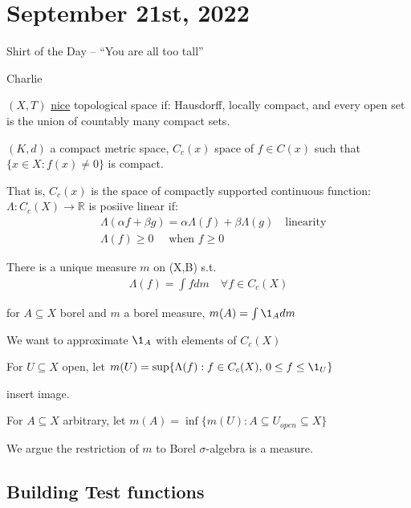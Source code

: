 \section{September 21st, 2022}

\epigraph{Shirt of the Day -- ``You are all too tall''}{Charlie}

\begin{definition}
	$(X,T)$ \underline{nice} topological space if: Hausdorff, locally compact, and every open set is the union of countably many compact sets.
\end{definition}

\begin{example}
	$(K,d)$ a compact metric space, $C_c (x)$ space of $f \in C(x)$ such that $\{x\in X: f(x) \neq 0 \}$ is compact.

	That is, $C_c (x)$ is the space of compactly supported continuous function:
		$\Lambda : C_c(X) \to \mathbb{R}$ is posiive linear if:
	\begin{align*}
		&\Lambda(\alpha f + \beta g) = \alpha \Lambda(f) + \beta \Lambda(g) \quad \text{linearity} \\
		&\Lambda(f) \geq 0 \quad \text{ when } f \geq 0
	\end{align*} 
\end{example}


\begin{theorem}
	There is a unique measure $m$ on (X,B) s.t.
	\begin{align*}
		\Lambda(f) = \int f dm \quad \forall f \in C_c (X)
	\end{align*} 
\end{theorem}

\begin{definition}[defining m]
	for $A \subseteq X$ borel and $m$ a borel measure, $m(A) = \int \1_{A} dm$
\end{definition}

We want to approximate $\1_A$ with elements of $C_c (X)$

For $U \subseteq X $ open, let $m(U) = \sup\{\Lambda (f) : f \in C_c (X), \, 0 \leq f \leq \1_{U} \}$

insert image.

For $A \subseteq X$ arbitrary, let $m(A) = \inf\{m(U) : A \subseteq U_{open} \subseteq X\}$

We argue the restriction of $m$ to Borel $\sigma$-algebra is a measure.

\subsection{Building Test functions}

